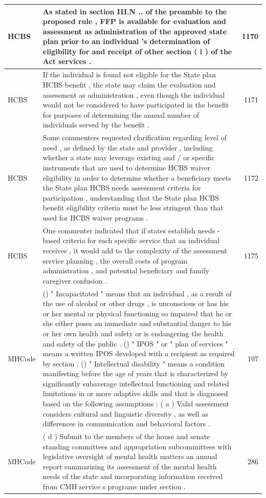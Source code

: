 \documentclass[
]{book}
\begin{document}
\begin{tabular}{l|l|r}
\hline
HCBS & As stated in section III.N .. of the preamble to the proposed rule , FFP is available for evaluation and assessment as administration of the approved state plan prior to an individual 's determination of eligibility for and receipt of other section ( i ) of the Act services . & 1170\\
\hline
HCBS & If the individual is found not eligible for the State plan HCBS benefit , the state may claim the evaluation and assessment as administration , even though the individual would not be considered to have participated in the benefit for purposes of determining the annual number of individuals served by the benefit . & 1171\\
\hline
HCBS & Some commenters requested clarification regarding level of need , as defined by the state and provider , including whether a state may leverage existing and / or specific instruments that are used to determine HCBS waiver eligibility in order to determine whether a beneficiary meets the State plan HCBS needs assessment criteria for participation , understanding that the State plan HCBS benefit eligibility criteria must be less stringent than that used for HCBS waiver programs . & 1172\\
\hline
HCBS & One commenter indicated that if states establish needs - based criteria for each specific service that an individual receives , it would add to the complexity of the assessment service planning , the overall costs of program administration , and potential beneficiary and family caregiver confusion . & 1175\\
\hline
MHCode & () " Incapacitated " means that an individual , as a result of the use of alcohol or other drugs , is unconscious or has his or her mental or physical functioning so impaired that he or she either poses an immediate and substantial danger to his or her own health and safety or is endangering the health and safety of the public . () " IPOS " or " plan of services " means a written IPOS developed with a recipient as required by section . () " Intellectual disability " means a condition manifesting before the age of years that is characterized by significantly subaverage intellectual functioning and related limitations in or more adaptive skills and that is diagnosed based on the following assumptions : ( a ) Valid assessment considers cultural and linguistic diversity , as well as differences in communication and behavioral factors . & 107\\
\hline
MHCode & ( d ) Submit to the members of the house and senate standing committees and appropriation subcommittees with legislative oversight of mental health matters an annual report summarizing its assessment of the mental health needs of the state and incorporating information received from CMH service s programs under section . & 286\\

\end{tabular}
\end{document}
